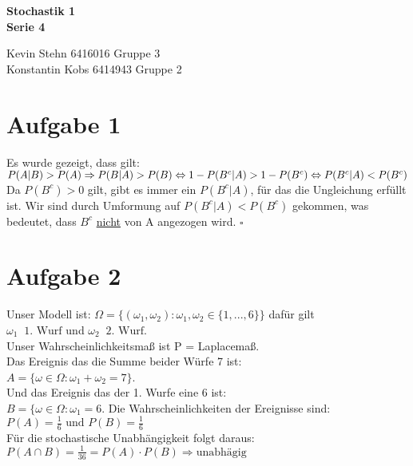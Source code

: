 \documentclass[10pt,a4paper]{article}
\newcommand{\ent}{\mathop{\widehat{=}}}
\newcommand{\w}{\omega}
\begin{document}
\begin{center}
\textbf{Stochastik 1 \\ Serie 4 \\}
\end{center}

\begin{flushright}
Kevin Stehn 6416016 Gruppe 3 \\
Konstantin Kobs 6414943 Gruppe 2
\end{flushright} 

\section*{Aufgabe 1}
Es wurde gezeigt, dass gilt:\\
$P(A|B) > P(A) \Rightarrow P(B|A) > P(B) \newline \Leftrightarrow 1 -P(B^c|A) > 1-P(B^c) \newline \Leftrightarrow P(B^c|A) < P(B^c)$\\
Da $P(B^c) > 0 $ gilt, gibt es immer ein $P(B^c|A)$, f\"ur das die Ungleichung erf\"ullt ist. Wir sind durch Umformung auf $P(B^c|A) < P(B^c)$ gekommen, was bedeutet, dass $B^c$ \underline{nicht} von A angezogen wird. $\square$

\section*{Aufgabe 2}
Unser Modell ist: $\Omega = \{(\w_1,\w_2) : \w_1,\w_2 \in \{1,...,6\} \}$ daf\"ur gilt\\
$\omega_1 \ent \text{1. Wurf}$ und $\w_2 \ent \text{2. Wurf}$.\\
Unser Wahrscheinlichkeitsmaß ist P = Laplacemaß.\\
Das Ereignis das die Summe beider W\"urfe 7 ist:\\
$A = \{\w \in \Omega : \w_1 + \w_2 = 7 \}$.\\
Und das Ereignis das der 1. Wurfe eine 6 ist:\\
$B = \{\w \in \Omega : \w_1 = 6$.
Die Wahrscheinlichkeiten der Ereignisse sind:\\
$P(A) = \frac{1}{6} \text{ und } P(B) = \frac{1}{6}$ \\
F\"ur die stochastische Unabh\"angigkeit folgt daraus:\\
$P(A \cap B) = \frac{1}{36} = P(A) \cdot P(B) \Rightarrow \text{unabh\"agig}$
\end{document}
